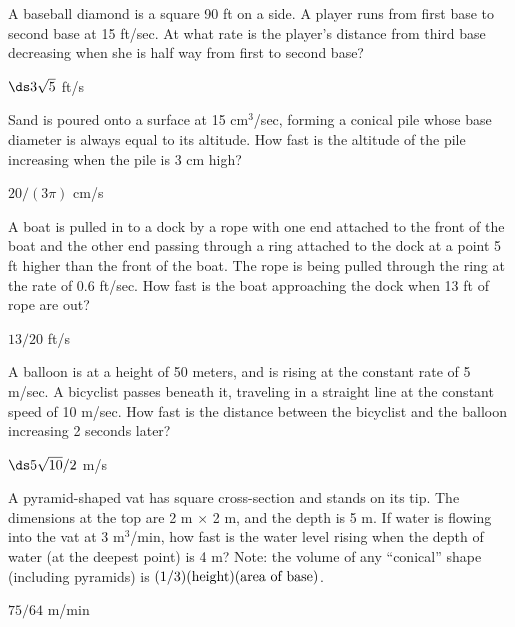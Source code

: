 \begin{enumialphparenastyle}
\begin{ex} 
A baseball diamond is a square 90 ft on a side.  A player runs from first
base to second base at 15 ft/sec.  At what rate is the player's distance
from third base decreasing when she is half way from first to second base?
\begin{sol}
	$\ds 3\sqrt5$ ft/s
\end{sol}
\end{ex}

\begin{ex} 
Sand is poured onto a surface at 15 cm${}^3$/sec, forming a
conical pile whose base diameter is always equal to its altitude.  How
fast is the altitude of the pile increasing when the pile is 3 cm
high?
\begin{sol}
	$20/(3\pi)$ cm/s
\end{sol}
\end{ex}

\begin{ex} 
A boat is pulled in to a dock by a rope with one end attached to the front
of the boat and the other end passing through a ring attached to the dock
at a point 5 ft higher than the front of the boat.  The rope is being
pulled through the ring at the rate of 0.6 ft/sec.  How fast is the boat
approaching the dock when 13 ft of rope are out?
\begin{sol}
	$13/20$ ft/s
\end{sol}
\end{ex}

\begin{ex} 
A balloon is at a height of 50 meters, and is rising at the constant rate
of 5 m/sec.  A bicyclist passes beneath it, traveling in a
straight line at the constant speed of 10 m/sec.  How fast is the distance
between the bicyclist and the balloon increasing 2 seconds later?
\begin{sol}
	$\ds 5\sqrt{10}/2$ m/s
\end{sol}
\end{ex}

\begin{ex} 
A pyramid-shaped vat has square cross-section and stands on its
tip.  The dimensions at the top are 2 m $\times$ 2 m, and the depth is
5 m.  If water is flowing into the vat at 3 m${}^3$/min, how fast is
the water level rising when the depth of water (at the deepest point)
is 4 m?  Note: the volume of any ``conical'' shape (including
pyramids) is $(1/3)(\hbox{height})(\hbox{area of base})$.
\begin{sol}
	$75/64$ m/min
\end{sol}
\end{ex}


\end{enumialphparenastyle}
